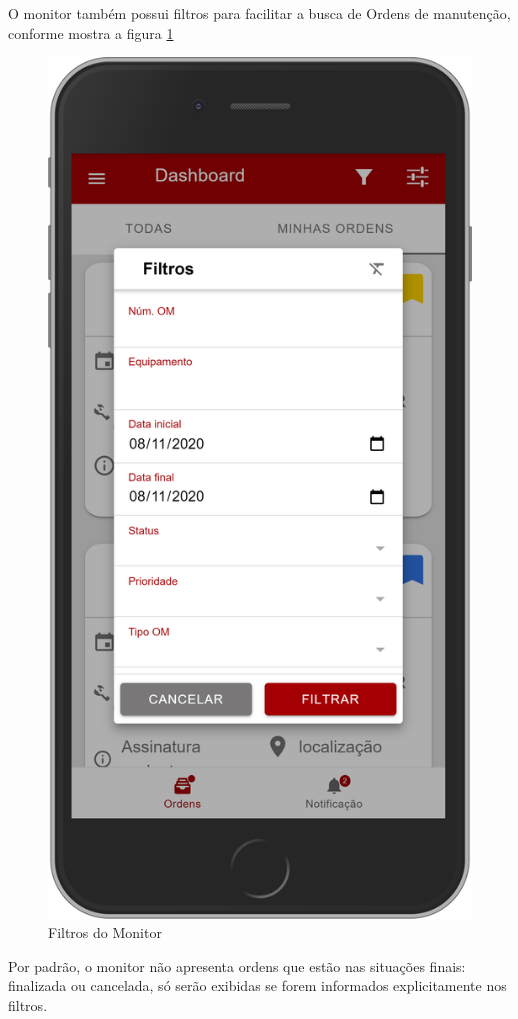 O monitor também possui filtros para facilitar a busca de Ordens de manutenção, conforme mostra a figura \ref{mobile-monitor-filtro}
\begin{figure}[H]
	\caption{\label{mobile-monitor-filtro}Filtros do Monitor}
	\begin{center}
		\includegraphics[scale=0.20]{./Figuras/agil.it/mobile-monitor-filtro.png}
	\end{center}
\end{figure}
Por padrão, o monitor não apresenta ordens que estão nas situações finais: finalizada ou cancelada, só serão exibidas se forem informados explicitamente nos filtros.

